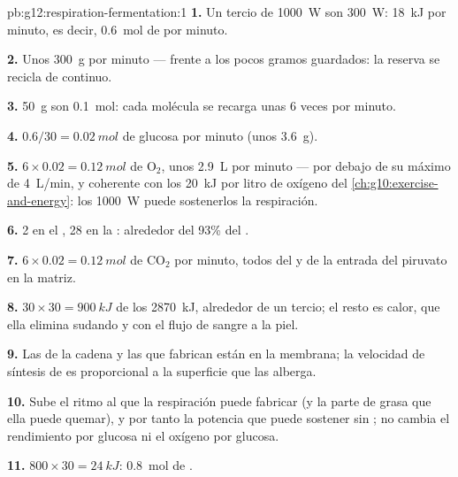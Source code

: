 \begin{solution}{pb:g12:respiration-fermentation:1}
\textbf{1.} Un tercio de \qty{1000}{W} son \qty{300}{W}: \qty{18}{kJ}
por minuto, es decir, \qty{0.6}{mol} de  por minuto.

\textbf{2.} Unos \qty{300}{g} por minuto --- frente a los pocos gramos
guardados: la reserva se recicla de continuo.

\textbf{3.} \qty{50}{g} son \qty{0.1}{mol}: cada molécula se recarga
unas 6 veces por minuto.

\textbf{4.} $0.6/30 = \qty{0.02}{mol}$ de glucosa por minuto (unos
\qty{3.6}{g}).

\textbf{5.} $6 \times 0.02 = \qty{0.12}{mol}$ de $\mathrm{O_2}$, unos
\qty{2.9}{L} por minuto --- por debajo de su máximo de \qty{4}{L/min},
y coherente con los \qty{20}{kJ} por litro de oxígeno del
\cref{ch:g10:exercise-and-energy}: los \qty{1000}{W} puede
sostenerlos la respiración.

\textbf{6.} 2 en el , 28 en la : alrededor del
93\% del .

\textbf{7.} $6 \times 0.02 = \qty{0.12}{mol}$ de $\mathrm{CO_2}$ por
minuto, todos del  y de la entrada del piruvato en la
matriz.

\textbf{8.} $30 \times 30 = \qty{900}{kJ}$ de los \qty{2870}{kJ},
alrededor de un tercio; el resto es calor, que ella elimina sudando y
con el flujo de sangre a la piel.

\textbf{9.} Las  de la cadena y las  que fabrican 
están en la membrana; la velocidad de síntesis de  es proporcional a
la superficie que las alberga.

\textbf{10.} Sube el ritmo al que la respiración puede fabricar  (y
la parte de grasa que ella puede quemar), y por tanto la potencia que
puede sostener sin ; no cambia el rendimiento por glucosa
ni el oxígeno por glucosa.

\textbf{11.} $800 \times 30 = \qty{24}{kJ}$: \qty{0.8}{mol} de .


\end{solution}
